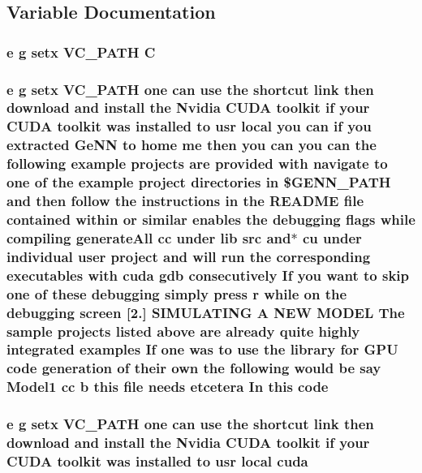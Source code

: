 \subsection{Variable Documentation}
\hypertarget{README_8txt_aacbc294df2c305f93084b177996ed83c}{
\subsubsection[{C}]{\setlength{\rightskip}{0pt plus 5cm}e g setx V\+C\+\_\+\+P\+A\+T\+H C}}\label{README_8txt_aacbc294df2c305f93084b177996ed83c}
\hypertarget{README_8txt_a84d41a61227d98dc461b51f8ecf8d8c0}{
\subsubsection[{code}]{\setlength{\rightskip}{0pt plus 5cm}e g setx V\+C\+\_\+\+P\+A\+T\+H one can {\bf use} the shortcut link then download and install the Nvidia C\+U\+D\+A toolkit if your C\+U\+D\+A toolkit was installed {\bf to} usr local you can if you extracted {\bf Ge\+N\+N} {\bf to} home me then you can you can the following example projects are provided {\bf with} navigate {\bf to} one of the example {\bf project} directories {\bf in} \$G\+E\+N\+N\+\_\+\+P\+A\+T\+H and then follow the instructions {\bf in} the R\+E\+A\+D\+M\+E {\bf file} contained within {\bf or} similar enables the debugging flags while compiling generate\+All cc under lib src and$\ast$ cu under individual user {\bf project} and will run the corresponding executables {\bf with} {\bf cuda} gdb consecutively If you want {\bf to} skip one of these debugging simply press r while on the debugging screen \mbox{[}2.\mbox{]} S\+I\+M\+U\+L\+A\+T\+I\+N\+G A N\+E\+W M\+O\+D\+E\+L The sample projects listed above are already quite highly integrated examples If one was {\bf to} {\bf use} the library for {\bf G\+P\+U} code generation of their own the following would be say Model1 cc b this {\bf file} needs etcetera In this code}}\label{README_8txt_a84d41a61227d98dc461b51f8ecf8d8c0}
\hypertarget{README_8txt_a386e5818501e36b046e9cf9ee9a1a6b0}{
\subsubsection[{cuda}]{\setlength{\rightskip}{0pt plus 5cm}e g setx V\+C\+\_\+\+P\+A\+T\+H one can {\bf use} the shortcut link then download and install the Nvidia C\+U\+D\+A toolkit if your C\+U\+D\+A toolkit was installed {\bf to} usr local cuda}}\label{README_8txt_a386e5818501e36b046e9cf9ee9a1a6b0}
